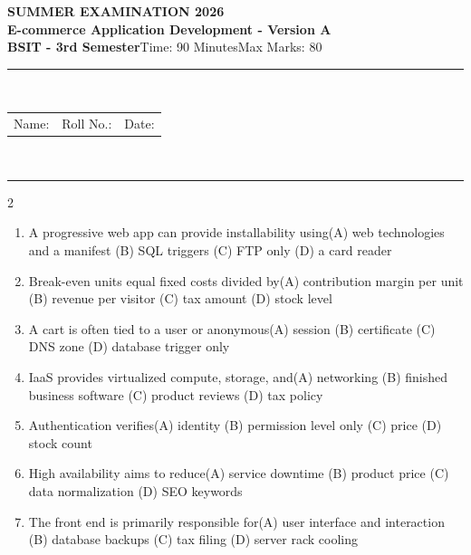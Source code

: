 \documentclass[a4paper]{article}
\makeatletter
\newcommand{\examheader}{%
\begin{center}\textbf{\large SUMMER EXAMINATION 2026}\\[-1pt]
\textbf{\normalsize E-commerce Application Development - Version A}\\[-1pt]
\textbf{BSIT - 3rd Semester}\quad Time: 90 Minutes\quad Max Marks: 80\\[-1pt]
\textcolor{black!65}{\rule{\linewidth}{0.45pt}}\\[-2pt]
\begin{tabularx}{\linewidth}{@{}X X X@{}}Name: \hrulefill & Roll No.: \hrulefill & Date: \hrulefill\end{tabularx}\\[-1pt]
\textcolor{black!65}{\rule{\linewidth}{0.45pt}}\end{center}}
\makeatother
\begin{document}
\examheader
\raggedcolumns
\begin{multicols*}{2}
\fontsize{8.5}{10}\selectfont
\begin{enumerate}
\item A progressive web app can provide installability using\newline\hspace*{0.6em}(A) web technologies and a manifest \quad (B) SQL triggers \newline\hspace*{0.6em}(C) FTP only \quad (D) a card reader
\item Break-even units equal fixed costs divided by\newline\hspace*{0.6em}(A) contribution margin per unit \quad (B) revenue per visitor \newline\hspace*{0.6em}(C) tax amount \quad (D) stock level
\item A cart is often tied to a user or anonymous\newline\hspace*{0.6em}(A) session \quad (B) certificate \newline\hspace*{0.6em}(C) DNS zone \quad (D) database trigger only
\item IaaS provides virtualized compute, storage, and\newline\hspace*{0.6em}(A) networking \quad (B) finished business software \newline\hspace*{0.6em}(C) product reviews \quad (D) tax policy
\item Authentication verifies\newline\hspace*{0.6em}(A) identity \quad (B) permission level only \newline\hspace*{0.6em}(C) price \quad (D) stock count
\item High availability aims to reduce\newline\hspace*{0.6em}(A) service downtime \quad (B) product price \newline\hspace*{0.6em}(C) data normalization \quad (D) SEO keywords
\item The front end is primarily responsible for\newline\hspace*{0.6em}(A) user interface and interaction \quad (B) database backups \newline\hspace*{0.6em}(C) tax filing \quad (D) server rack cooling

\end{enumerate}
\end{multicols*}
\end{document}
